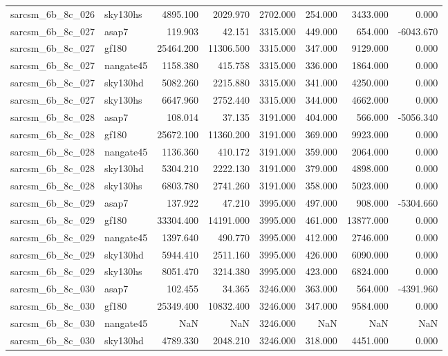 \begin{tabular}{llrrrrrr}
sarcsm\_6b\_8c\_026 & sky130hs & 4895.100 & 2029.970 & 2702.000 & 254.000 & 3433.000 & 0.000 \\
sarcsm\_6b\_8c\_027 & asap7 & 119.903 & 42.151 & 3315.000 & 449.000 & 654.000 & -6043.670 \\
sarcsm\_6b\_8c\_027 & gf180 & 25464.200 & 11306.500 & 3315.000 & 347.000 & 9129.000 & 0.000 \\
sarcsm\_6b\_8c\_027 & nangate45 & 1158.380 & 415.758 & 3315.000 & 336.000 & 1864.000 & 0.000 \\
sarcsm\_6b\_8c\_027 & sky130hd & 5082.260 & 2215.880 & 3315.000 & 341.000 & 4250.000 & 0.000 \\
sarcsm\_6b\_8c\_027 & sky130hs & 6647.960 & 2752.440 & 3315.000 & 344.000 & 4662.000 & 0.000 \\
sarcsm\_6b\_8c\_028 & asap7 & 108.014 & 37.135 & 3191.000 & 404.000 & 566.000 & -5056.340 \\
sarcsm\_6b\_8c\_028 & gf180 & 25672.100 & 11360.200 & 3191.000 & 369.000 & 9923.000 & 0.000 \\
sarcsm\_6b\_8c\_028 & nangate45 & 1136.360 & 410.172 & 3191.000 & 359.000 & 2064.000 & 0.000 \\
sarcsm\_6b\_8c\_028 & sky130hd & 5304.210 & 2222.130 & 3191.000 & 379.000 & 4898.000 & 0.000 \\
sarcsm\_6b\_8c\_028 & sky130hs & 6803.780 & 2741.260 & 3191.000 & 358.000 & 5023.000 & 0.000 \\
sarcsm\_6b\_8c\_029 & asap7 & 137.922 & 47.210 & 3995.000 & 497.000 & 908.000 & -5304.660 \\
sarcsm\_6b\_8c\_029 & gf180 & 33304.400 & 14191.000 & 3995.000 & 461.000 & 13877.000 & 0.000 \\
sarcsm\_6b\_8c\_029 & nangate45 & 1397.640 & 490.770 & 3995.000 & 412.000 & 2746.000 & 0.000 \\
sarcsm\_6b\_8c\_029 & sky130hd & 5944.410 & 2511.160 & 3995.000 & 426.000 & 6090.000 & 0.000 \\
sarcsm\_6b\_8c\_029 & sky130hs & 8051.470 & 3214.380 & 3995.000 & 423.000 & 6824.000 & 0.000 \\
sarcsm\_6b\_8c\_030 & asap7 & 102.455 & 34.365 & 3246.000 & 363.000 & 564.000 & -4391.960 \\
sarcsm\_6b\_8c\_030 & gf180 & 25349.400 & 10832.400 & 3246.000 & 347.000 & 9584.000 & 0.000 \\
sarcsm\_6b\_8c\_030 & nangate45 & NaN & NaN & 3246.000 & NaN & NaN & NaN \\
sarcsm\_6b\_8c\_030 & sky130hd & 4789.330 & 2048.210 & 3246.000 & 318.000 & 4451.000 & 0.000 \\

\end{tabular}
